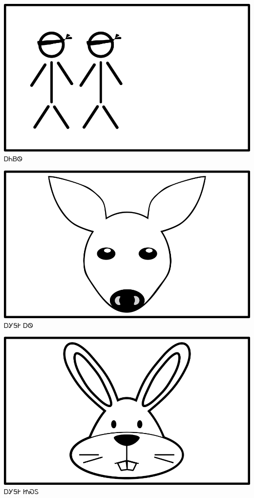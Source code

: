 \documentclass[avery5371]{flashcards}%
\begin{document}
    \begin{flashcard}{
        \includegraphics[width=0.95\columnwidth,height=.51\columnwidth,keepaspectratio]{../artwork/flags/aniyvwi-no-flag-blind}
    }
        \Huge ᎠᏂᏴᏫ
    \end{flashcard}


    \begin{flashcard}{
        \includegraphics[width=0.95\columnwidth,height=.51\columnwidth,keepaspectratio]{../artwork/objects-animate/ahwi}
    }
        \Huge ᎠᎩᎦᎨ ᎠᏫ
    \end{flashcard}

    \begin{flashcard}{
        \includegraphics[width=0.95\columnwidth,height=.51\columnwidth,keepaspectratio]{../artwork/objects-animate/jisdu}
    }
        \Huge ᎠᎩᎦᎨ ᏥᏍᏚ
    \end{flashcard}
\end{document}

